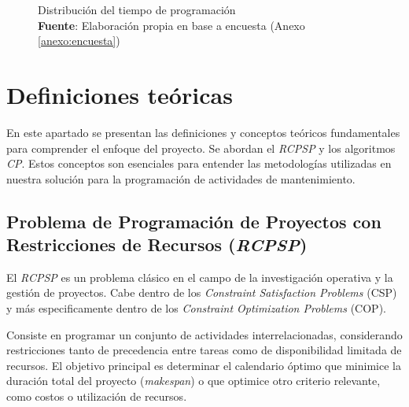 \documentclass{article}
\begin{document}
\begin{figure}[htbp]
    \centering
    \captionsetup{justification=centering} %
    \caption{Distribución del tiempo de programación \\ \textbf{Fuente}: Elaboración propia en base a encuesta (Anexo \ref{anexo:encuesta})}
    \label{fig:pie_chart}
  \end{figure}

\section{Definiciones teóricas}
En este apartado se presentan las definiciones y conceptos teóricos fundamentales para comprender el enfoque del proyecto. Se abordan el \textit{RCPSP} y los algoritmos \textit{CP}. Estos conceptos son esenciales para entender las metodologías utilizadas en nuestra solución para la programación de actividades de mantenimiento.

\subsection{Problema de Programación de Proyectos con Restricciones de Recursos (\textit{RCPSP})}
El \textit{RCPSP} es un problema clásico en el campo de la investigación operativa y la gestión de proyectos. Cabe dentro de los \textit{Constraint Satisfaction Problems} (CSP) y más especificamente dentro de los \textit{Constraint Optimization Problems} (COP).

Consiste en programar un conjunto de actividades interrelacionadas, considerando restricciones tanto de precedencia entre tareas como de disponibilidad limitada de recursos. El objetivo principal es determinar el calendario óptimo que minimice la duración total del proyecto (\textit{makespan}) o que optimice otro criterio relevante, como costos o utilización de recursos\cite{artigues2008resource}.
    
\end{document}
